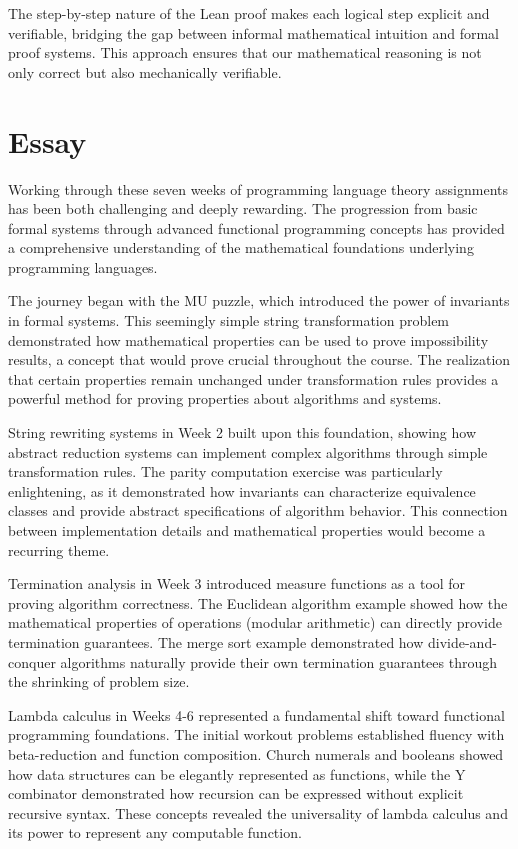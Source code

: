 \documentclass{article}
\theoremstyle{plain}
\theoremstyle{definition}
\theoremstyle{remark}
\begin{document}
The step-by-step nature of the Lean proof makes each logical step explicit and verifiable, bridging the gap between informal mathematical intuition and formal proof systems. This approach ensures that our mathematical reasoning is not only correct but also mechanically verifiable.

\section{Essay}

Working through these seven weeks of programming language theory assignments has been both challenging and deeply rewarding. The progression from basic formal systems through advanced functional programming concepts has provided a comprehensive understanding of the mathematical foundations underlying programming languages.

The journey began with the MU puzzle, which introduced the power of invariants in formal systems. This seemingly simple string transformation problem demonstrated how mathematical properties can be used to prove impossibility results, a concept that would prove crucial throughout the course. The realization that certain properties remain unchanged under transformation rules provides a powerful method for proving properties about algorithms and systems.

String rewriting systems in Week 2 built upon this foundation, showing how abstract reduction systems can implement complex algorithms through simple transformation rules. The parity computation exercise was particularly enlightening, as it demonstrated how invariants can characterize equivalence classes and provide abstract specifications of algorithm behavior. This connection between implementation details and mathematical properties would become a recurring theme.

Termination analysis in Week 3 introduced measure functions as a tool for proving algorithm correctness. The Euclidean algorithm example showed how the mathematical properties of operations (modular arithmetic) can directly provide termination guarantees. The merge sort example demonstrated how divide-and-conquer algorithms naturally provide their own termination guarantees through the shrinking of problem size.

Lambda calculus in Weeks 4-6 represented a fundamental shift toward functional programming foundations. The initial workout problems established fluency with beta-reduction and function composition. Church numerals and booleans showed how data structures can be elegantly represented as functions, while the Y combinator demonstrated how recursion can be expressed without explicit recursive syntax. These concepts revealed the universality of lambda calculus and its power to represent any computable function.
\end{document}

